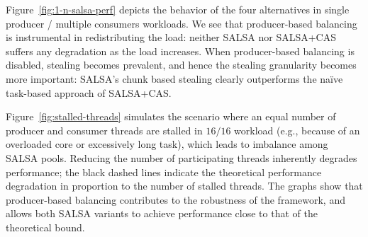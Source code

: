 Figure~\ref{fig:1-n-salsa-perf} depicts the behavior of the four alternatives in single producer / multiple consumers workloads. 
We see that producer-based balancing is instrumental in redistributing the load: neither SALSA nor SALSA+CAS suffers any degradation as the load increases. 
When producer-based balancing is disabled, stealing becomes prevalent, and hence the stealing granularity becomes more important: 
SALSA's chunk based stealing clearly outperforms the na\"{i}ve task-based approach of SALSA+CAS. 

Figure~\ref{fig:stalled-threads} simulates the scenario where an equal number of producer and consumer threads are stalled in $16/16$ workload (e.g., because of an overloaded core or excessively long task), which leads to imbalance among SALSA pools.
Reducing the number of participating threads inherently degrades performance; the black dashed lines indicate the theoretical performance degradation in proportion to the number of stalled threads.
The graphs show that producer-based balancing contributes to the robustness of the framework, and allows both SALSA variants to achieve performance close to that of the theoretical bound. 

%
%
%
%
